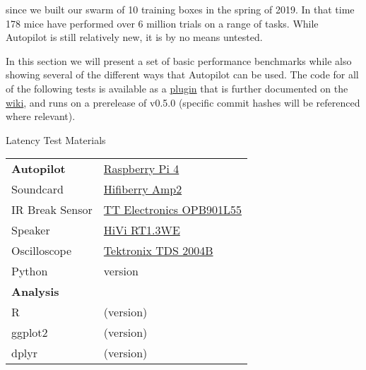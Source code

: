 
 since we built our swarm of 10 training boxes in the spring of 2019. In that time 178 mice have performed over 6 million trials on a range of tasks. While Autopilot is still relatively new, it is by no means untested.

In this section we will present a set of basic performance benchmarks while also showing several of the different ways that Autopilot can be used. The code for all of the following tests is available as a \href{https://github.com/auto-pi-lot/plugin-tests}{plugin} that is further documented on the \href{https://wiki.auto-pi-lot.com/index.php/Plugin:Autopilot_Paper}{wiki}, and runs on a prerelease of v0.5.0 (specific commit hashes will be referenced where relevant). 

\begin{margintable}[-0.5cm]
\caption{Latency Test Materials}
\label{tab:materials}
\noindent\begin{tabularx}{\linewidth}{lX}%
\toprule
\textbf{Autopilot} & \href{https://www.raspberrypi.org/products/raspberry-pi-4-model-b/}{Raspberry Pi 4}\\
Soundcard & \href{https://www.hifiberry.com/shop/boards/hifiberry-amp2/}{Hifiberry Amp2} \\
IR Break Sensor & \href{https://www.digikey.com/product-detail/en/tt-electronics-optek-technology/OPB901L55/365-1767-ND/1637490}{TT Electronics OPB901L55}\\
Speaker & \href{https://www.parts-express.com/hivi-rt13we-isodynamic-tweeter--297-421}{HiVi RT1.3WE}\\
Oscilloscope & \href{https://download.tek.com/manual/071181702web.pdf}{Tektronix TDS 2004B}\\
\midrule
Python & version \\
\midrule
\textbf{Analysis} & \\
R & (version) \\
ggplot2 & (version) \\
dplyr & (version) \\
\bottomrule
\end{tabularx}
\end{margintable}
